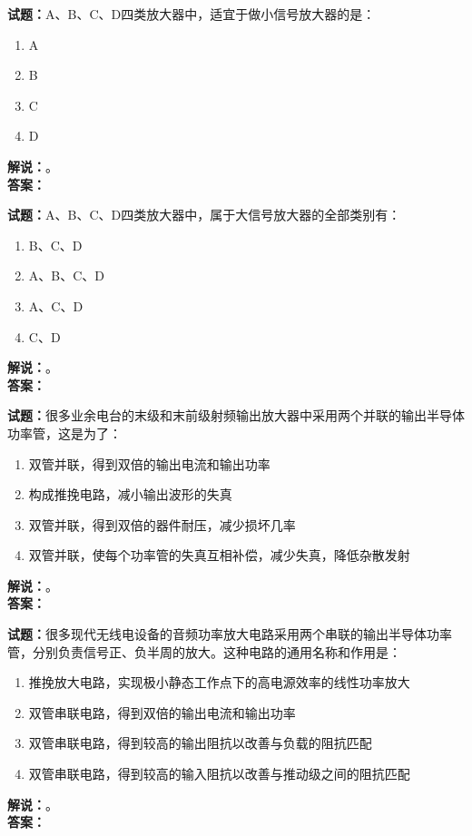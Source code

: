 \documentclass{ctexbook}
\begin{document}
\bigskip

\noindent\textbf{试题：}A、B、C、D四类放大器中，适宜于做小信号放大器的是：
\begin{enumerate}[leftmargin=3em]
  \item A
  \item B
  \item C
  \item D
\end{enumerate}
\noindent\textbf{解说：}\textbf{}。\\\noindent\textbf{答案：}

\bigskip

\noindent\textbf{试题：}A、B、C、D四类放大器中，属于大信号放大器的全部类别有：
\begin{enumerate}[leftmargin=3em]
  \item B、C、D
  \item A、B、C、D
  \item A、C、D
  \item C、D
\end{enumerate}
\noindent\textbf{解说：}\textbf{}。\\\noindent\textbf{答案：}

\bigskip

\noindent\textbf{试题：}很多业余电台的末级和末前级射频输出放大器中采用两个并联的输出半导体功率管，这是为了：
\begin{enumerate}[leftmargin=3em]
  \item 双管并联，得到双倍的输出电流和输出功率
  \item 构成推挽电路，减小输出波形的失真
  \item 双管并联，得到双倍的器件耐压，减少损坏几率
  \item 双管并联，使每个功率管的失真互相补偿，减少失真，降低杂散发射
\end{enumerate}
\noindent\textbf{解说：}\textbf{}。\\\noindent\textbf{答案：}

\bigskip

\noindent\textbf{试题：}很多现代无线电设备的音频功率放大电路采用两个串联的输出半导体功率管，分别负责信号正、负半周的放大。这种电路的通用名称和作用是：
\begin{enumerate}[leftmargin=3em]
  \item 推挽放大电路，实现极小静态工作点下的高电源效率的线性功率放大
  \item 双管串联电路，得到双倍的输出电流和输出功率
  \item 双管串联电路，得到较高的输出阻抗以改善与负载的阻抗匹配
  \item 双管串联电路，得到较高的输入阻抗以改善与推动级之间的阻抗匹配
\end{enumerate}
\noindent\textbf{解说：}\textbf{}。\\\noindent\textbf{答案：}
\end{document}

